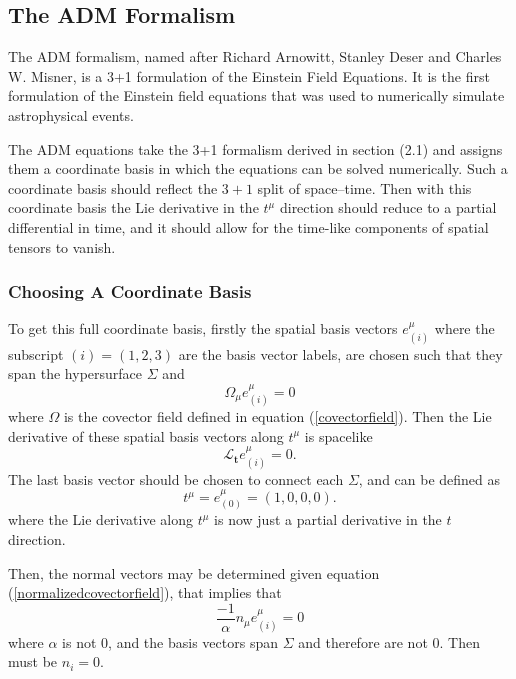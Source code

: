 \documentclass[11pt]{article}
\numberwithin{equation}{section}
\begin{document}
\subsection{The ADM Formalism} 
The ADM formalism, named after Richard Arnowitt, Stanley Deser and Charles W. Misner, is a 3+1 formulation of the Einstein Field Equations. It is the first formulation of the Einstein field equations that was used to numerically simulate astrophysical events.

The ADM equations take the 3+1 formalism derived in section (2.1) and assigns them a coordinate basis in which the equations can be solved numerically. Such a coordinate basis should reflect the $3+1$ split of space--time. Then with this coordinate basis the Lie derivative in the $t^{\mu}$ direction should reduce to a partial differential in time, and it should allow for the time-like components of spatial tensors to vanish. 

\subsubsection{Choosing A Coordinate Basis}

To get this full coordinate basis, firstly the spatial basis vectors $e^{\mu}_{(i)}$ where the subscript $(i) = (1, 2, 3)$ are the basis vector labels, are chosen such that they span the hypersurface $\Sigma$ and
\begin{equation}
\Omega_{\mu}e^{\mu}_{(i)} = 0
\end{equation}
where $\Omega$ is the covector field defined in equation (\ref{covectorfield}). Then the Lie derivative of these spatial basis vectors along $t^{\mu}$ is spacelike
\begin{equation}
\mathcal{L_{\textbf{t}}}e^{\mu}_{(i)} = 0.
\end{equation}
The last basis vector should be chosen to connect each $\Sigma$, and can be defined as
\begin{equation}
t^{\mu} = e^{\mu}_{(0)} = (1, 0, 0, 0).
\end{equation}
where the Lie derivative along $t^{\mu}$ is now just a partial derivative in the $t$ direction.

Then, the normal vectors may be determined given equation (\ref{normalizedcovectorfield}), that implies that
\begin{equation}
\frac{-1}{\alpha} n_{\mu}e^{\mu}_{(i)} = 0
\end{equation}
where $\alpha$ is not $0$, and the basis vectors span $\Sigma$ and therefore are not $0$. Then must be $n_i = 0$. 
\end{document}
